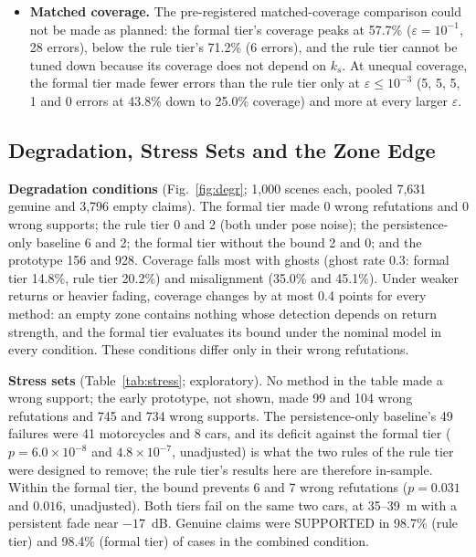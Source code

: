 \begin{itemize}
\item \textbf{Matched coverage.} The pre-registered matched-coverage comparison could not be made as planned: the formal tier's coverage peaks at 57.7\% ($\varepsilon = 10^{-1}$, 28 errors), below the rule tier's 71.2\% (6 errors), and the rule tier cannot be tuned down because its coverage does not depend on $k_s$. At unequal coverage, the formal tier made fewer errors than the rule tier only at $\varepsilon \le 10^{-3}$ (5, 5, 5, 1 and 0 errors at 43.8\% down to 25.0\% coverage) and more at every larger $\varepsilon$.
\end{itemize}



\subsection{Degradation, Stress Sets and the Zone Edge}\label{sec:degr}



\textbf{Degradation conditions} (Fig.~\ref{fig:degr}; 1,000 scenes each, pooled 7,631 genuine and 3,796 empty claims). The formal tier made 0 wrong refutations and 0 wrong supports; the rule tier 0 and 2 (both under pose noise); the persistence-only baseline 6 and 2; the formal tier without the bound 2 and 0; and the prototype 156 and 928. Coverage falls most with ghosts (ghost rate 0.3: formal tier 14.8\%, rule tier 20.2\%) and misalignment (35.0\% and 45.1\%). Under weaker returns or heavier fading, coverage changes by at most 0.4 points for every method: an empty zone contains nothing whose detection depends on return strength, and the formal tier evaluates its bound under the nominal model in every condition. These conditions differ only in their wrong refutations.

\textbf{Stress sets} (Table~\ref{tab:stress}; exploratory). No method in the table made a wrong support; the early prototype, not shown, made 99 and 104 wrong refutations and 745 and 734 wrong supports. The persistence-only baseline's 49 failures were 41 motorcycles and 8 cars, and its deficit against the formal tier ($p = 6.0 \times 10^{-8}$ and $4.8 \times 10^{-7}$, unadjusted) is what the two rules of the rule tier were designed to remove; the rule tier's results here are therefore in-sample. Within the formal tier, the bound prevents 6 and 7 wrong refutations ($p = 0.031$ and $0.016$, unadjusted). Both tiers fail on the same two cars, at 35--39~m with a persistent fade near $-17$~dB. Genuine claims were SUPPORTED in 98.7\% (rule tier) and 98.4\% (formal tier) of cases in the combined condition.

